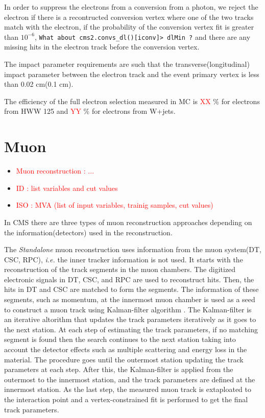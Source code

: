 In order to suppress the electrons from a conversion from a photon, we reject the electron 
if there is a recontructed conversion vertex where one of the two tracks match with 
the electron, if the probability of the conversion vertex fit is greater than $10^{-6}$, 
\verb|What about cms2.convs_dl()[iconv]> dlMin ?|  
and there are any missing hits in the electron track before the conversion vertex.   

The impact parameter requirements are such that the transverse(longitudinal) impact parameter
between the electron track and the event primary vertex is less than 0.02 cm(0.1 cm). 

The efficiency of the full electron selection measured in MC is \textcolor{red}{XX} \% 
for electrons from HWW 125 and \textcolor{red}{YY} \% for electrons from W+jets.  

\section{ Muon }
\begin{itemize}
\item \textcolor{red}{Muon reconstruction : ...}
\item \textcolor{red}{ID  : list variables and cut values }
\item \textcolor{red}{ISO : MVA (list of input variables, trainig samples, cut values) }
\end{itemize}

In CMS there are three types of muon reconstruction approaches 
depending on the information(detectors) used in the reconstruction.  

The \textit{Standalone} muon reconstruction uses information from 
the muon system(DT, CSC, RPC), \textit{i.e.} the inner tracker information is not used. 
It starts with the reconstruction of the track segments in the muon chambers. 
The digitized electronic signals in DT, CSC, and RPC are used to 
reconstruct hits. Then, the hits in DT and CSC are matched to form the segments. 
The information of these segments, such as momentum, at the innermost 
muon chamber is used as a seed to construct a muon track using Kalman-filter 
algorithm \cite{kalmanfilter}. The Kalman-filter is an iterative altorithm 
that updates the track parameters iteratively as it goes to the next station. 
At each step of estimating the track parameters, if no matching segment is found 
then the search continues to the next station taking into account the detector 
effects such as multiple scattering and energy loss in the material. 
The procedure goes until the outermost station updating the track parameters 
at each step. After this, the Kalman-filter is applied from the outermost to 
the innermost station, and the track parameters are defined at the innermost 
station. As the last step, the measured muon track is extaploated to the interaction 
point and a vertex-constrained fit is performed to get the final track parameters. 

